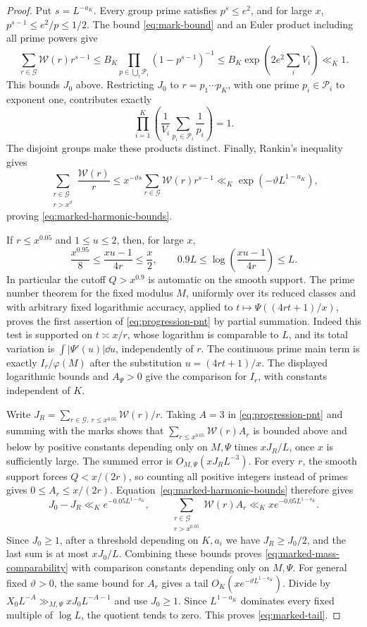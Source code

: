 \begin{proof}
Put \(s=L^{-a_K}\).  Every group prime satisfies \(p^s\le e^2\), and for
large \(x\), \(p^{s-1}\le e^2/p\le1/2\).  The bound
\eqref{eq:mark-bound} and an Euler product including all prime powers give
\[
 \sum_{r\in\mathcal G}\mathcal W(r)r^{s-1}
 \le B_K\prod_{p\in\bigcup_i\mathcal P_i}(1-p^{s-1})^{-1}
 \le B_K\exp\left(2e^2\sum_iV_i\right)\ll_K1.
\]
This bounds \(J_0\) above.  Restricting \(J_0\) to
\(r=p_1\cdots p_K\), with one prime \(p_i\in\mathcal P_i\) to exponent
one, contributes exactly
\[
 \prod_{i=1}^K\left(\frac1{V_i}\sum_{p_i\in\mathcal P_i}\frac1{p_i}\right)
 =1.
\]
The disjoint groups make these products distinct.  Finally, Rankin's
inequality gives
\[
 \sum_{\substack{r\in\mathcal G\\r>x^\vartheta}}\frac{\mathcal W(r)}r
 \le x^{-\vartheta s}\sum_{r\in\mathcal G}\mathcal W(r)r^{s-1}
 \ll_K\exp(-\vartheta L^{1-a_K}),
\]
proving \eqref{eq:marked-harmonic-bounds}.

If \(r\le x^{0.05}\) and \(1\le u\le2\), then, for large \(x\),
\[
 \frac{x^{0.95}}8\le\frac{xu-1}{4r}\le\frac x2,
 \qquad
 0.9L\le\log\left(\frac{xu-1}{4r}\right)\le L.
\]
In particular the cutoff \(Q>x^{0.9}\) is automatic on the smooth
support.  The prime number theorem for the fixed modulus \(M\), uniformly
over its reduced classes and with arbitrary fixed logarithmic accuracy,
applied to \(t\mapsto\Psi((4rt+1)/x)\), proves the first assertion of
\eqref{eq:progression-pnt} by partial summation.  Indeed this test is
supported on \(t\asymp x/r\), whose logarithm is comparable to \(L\), and
its total variation is \(\int|\Psi'(u)|\dd u\), independently of \(r\).
The continuous prime main term is exactly \(I_r/\varphi(M)\) after the
substitution \(u=(4rt+1)/x\).  The displayed logarithmic bounds and
\(A_\Psi>0\) give the comparison for \(I_r\), with constants independent
of \(K\).

Write \(J_R=\sum_{r\in\mathcal G,\ r\le x^{0.05}}\mathcal W(r)/r\).
Taking \(A=3\) in \eqref{eq:progression-pnt} and summing with the marks
shows that \(\sum_{r\le x^{0.05}}\mathcal W(r)A_r\) is bounded above and
below by positive constants depending only on \(M,\Psi\) times
\(xJ_R/L\), once \(x\) is sufficiently large.  The summed error is
\(O_{M,\Psi}(xJ_RL^{-3})\).  For every \(r\), the smooth support forces
\(Q<x/(2r)\), so counting all positive integers instead of primes gives
\(0\le A_r\le x/(2r)\).  Equation~\eqref{eq:marked-harmonic-bounds}
therefore gives
\[
 J_0-J_R\ll_K e^{-0.05L^{1-a_K}},\qquad
 \sum_{\substack{r\in\mathcal G\\r>x^{0.05}}}\mathcal W(r)A_r
       \ll_K x e^{-0.05L^{1-a_K}}.
\]
Since \(J_0\ge1\), after a threshold depending on \(K,a_i\) we have
\(J_R\ge J_0/2\), and the last sum is at most \(xJ_0/L\).  Combining these
bounds proves \eqref{eq:marked-mass-comparability} with comparison
constants depending only on \(M,\Psi\).  For general fixed \(\vartheta>0\),
the same bound for \(A_r\) gives a tail
\(O_K(xe^{-\vartheta L^{1-a_K}})\).  Divide by
\(X_0L^{-A}\gg_{M,\Psi}xJ_0L^{-A-1}\) and use \(J_0\ge1\).  Since
\(L^{1-a_K}\) dominates every fixed multiple of \(\log L\), the quotient
tends to zero.  This proves \eqref{eq:marked-tail}.
\end{proof}

